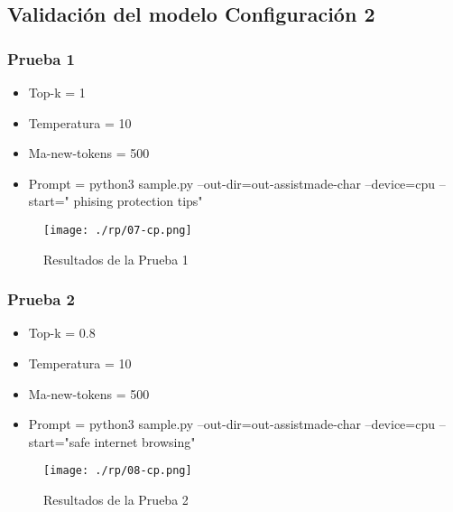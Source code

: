 \subsection{Validación del modelo Configuración 2}\label{section:Adaptación de modelo nanoGPT}
\subsubsection{ Prueba 1}\label{section:Adaptación de modelo nanoGPT}
    \begin{itemize}
        \item   Top-k = 1
        \item   Temperatura = 10
        \item   Ma-new-tokens = 500
        \item    Prompt = python3 sample.py --out-dir=out-assistmade-char --device=cpu --start=" phising protection tips"
    \end{itemize}
\begin{figure}[H]
   \centering %
       \texttt{[image: ./rp/07-cp.png]} 
   \caption{Resultados de la Prueba 1\cite{}}
  \label{figure:Resultado 1}  %
\end{figure}
\subsubsection{ Prueba 2}\label{section:Adaptación de modelo nanoGPT}
    \begin{itemize}
        \item   Top-k = 0.8
        \item   Temperatura = 10
        \item   Ma-new-tokens = 500
        \item   Prompt = python3 sample.py --out-dir=out-assistmade-char --device=cpu --start="safe internet browsing"
    \end{itemize}
\begin{figure}[H]
   \centering %
       \texttt{[image: ./rp/08-cp.png]} 
   \caption{Resultados de la Prueba 2\cite{}}
  \label{figure:Resultado 1}  %
\end{figure}
